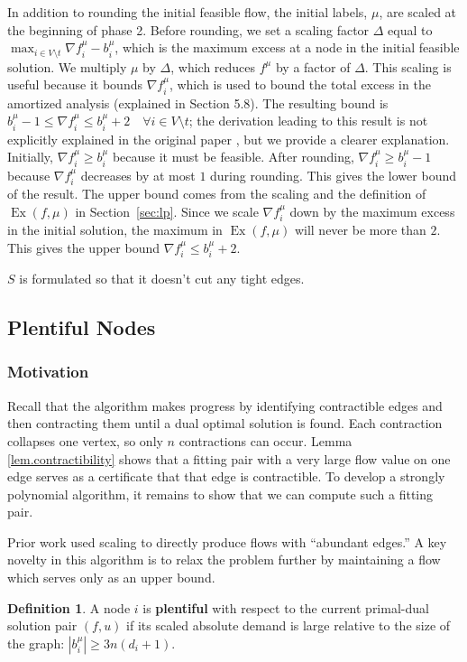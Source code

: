 \documentclass[11pt]{article}
\theoremstyle{definition}
\newtheorem{definition}{Definition}[section]
\theoremstyle{definition}
\newcommand{\fu}{f^{\mu}}
\newcommand{\nfiu}{\nabla \fu_i}
\newcommand{\biu}{b_{i}^{\mu}}
\DeclareMathOperator{\Ex}{Ex}
\begin{document}
    In addition to rounding the initial feasible flow, the initial labels, $\mu$, are scaled at the beginning of phase 2. Before rounding, we set a scaling factor $\Delta$ equal to $\max_{i \in V \setminus t} \nfiu - \biu$, which is the maximum excess at a node in the initial feasible solution. We multiply $\mu$ by $\Delta$, which reduces $f^\mu$ by a factor of $\Delta$. This scaling is useful because it bounds $\nfiu$, which is used to bound the total excess in the amortized analysis (explained in Section 5.8). The resulting bound is $\biu - 1 \leq \nfiu \leq \biu + 2 \quad \forall i \in V \setminus t $; the derivation leading to this result is not explicitly explained in the original paper \cite{Olver2017}, but we provide a clearer explanation. Initially, $\nfiu \geq \biu$ because it must be feasible. After rounding, $\nfiu \geq \biu - 1$ because $\nfiu$ decreases by at most $1$ during rounding. This gives the lower bound of the result. The upper bound comes from the scaling and the definition of $\Ex(f, \mu)$ in Section~\ref{sec:lp}. Since we scale $\nfiu$ down by the maximum excess in the initial solution, the maximum in $\Ex(f,\mu)$ will never be more than $2$. This gives the upper bound $\nfiu \leq \biu + 2$. 

	$S$ is formulated so that it doesn't cut any tight edges. 

	\subsection{Plentiful Nodes}

		\subsubsection{Motivation}
		
		Recall that the algorithm makes progress by
		identifying contractible edges and then contracting them until a dual optimal
		solution is found. Each contraction collapses one vertex, so only $n$ contractions
		can occur. Lemma \ref{lem.contractibility} shows that a fitting pair with a very
		large flow value on one edge serves as a certificate that that edge is contractible.
		To develop a strongly polynomial algorithm, it remains to show that we can compute
		such a fitting pair.
		
		Prior work used scaling to directly produce flows with ``abundant edges.''
		A key novelty in this algorithm is to relax the problem further by maintaining
		a flow which serves only as an upper bound.
		\begin{definition}
		A node $i$ is \textbf{plentiful} with respect
		to the current primal-dual solution pair $(f,u)$ if its scaled absolute
		demand is large relative to the size of the graph: $|b_i^{\mu}| \ge 3n(d_i + 1)$.
		\end{definition}
		
\end{document}
